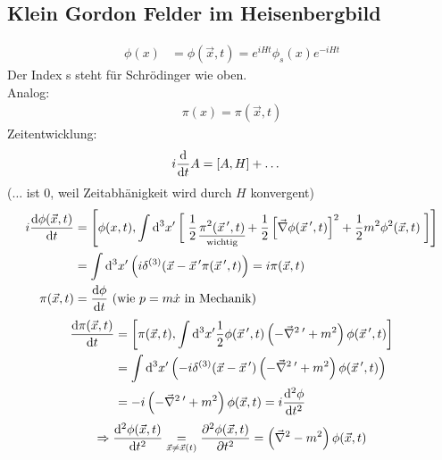 \subsection{Klein Gordon Felder im Heisenbergbild}
	\begin{align*}
		\phi (x) &= \phi(\vec{x}, t) = e^{i H t} \phi_s (x) e^{-i H t}
	\end{align*}
Der Index s steht für Schrödinger wie oben. 
\\
Analog:
	\begin{align*}
		\pi(x) = \pi(\vec{x}, t) 
	\end{align*}
Zeitentwicklung:
	\begin{align*}
		i \frac{\mathrm{d}}{\mathrm{d} t} A &= [A, H] + \ldots  
	\end{align*}
($\ldots$ ist 0, weil Zeitabhänigkeit wird durch $H$ konvergent) 
	\begin{align*}
		i \frac{\diff \phi(\vec{x}, t)}{\diff t} &= 
		\left[
			\phi(x, t), \int \diff^3 x' 
			\left[ \vphantom{\frac{1}{2}} \right.
				\frac{1}{2} \,\underset{\text{wichtig}}{\underline{\pi^2(\vec{x}\,', t)}} + \frac{1}{2}
				\left[
					\vec{\nabla} \phi (\vec{x}\,', t) 
				\right]^2 + \frac{1}{2} m^2 \phi^2(\vec{x}, t)
			\left. \vphantom{\frac{1}{2}} \right]
		\right] \\
		&= \int \diff^3 x' 
		\left(
			i \delta^{(3)} (\vec{x} - \vec{x}\,' \pi (\vec{x}\,', t) 
		\right) 
		= i \pi (\vec{x}, t) \\
		\pi (\vec{x}, t) &= \frac{\diff \phi}{\diff t} ~(\text{wie } p = m \dot{x} \text{ in Mechanik})
	\end{align*}
	\begin{align*}
		\frac{\mathrm{d} \pi (\vec{x}, t)}{\mathrm{d} t} &= 
		\left[
			\pi (\vec{x}, t) , \int \mathrm{d}^3 x' \frac{1}{2} \phi (\vec{x}\,', t)
			\left(
				-\vec{\nabla}^2\,' + m^2
			\right) \phi(\vec{x}\,', t)
		\right] \\
		&= \int \mathrm{d}^3 x' 
		\left(
			-i \delta^{(3)}(\vec{x} - \vec{x}\,') 
			\left(
				-\vec{\nabla}^2\,' + m^2 
			\right) \phi (\vec{x}\,', t)
		\right) \\
		&= -i \left(
			- \vec{\nabla}^2\,' + m^2
		\right) \phi(\vec{x}, t) = i \frac{\mathrm{d}^2 \phi}{\mathrm{d} t^2}
	\end{align*}
	\begin{align*}
		\Rightarrow \frac{\mathrm{d}^2 \phi(\vec{x}, t)}{\mathrm{d} t^2} \underset{\vec{x} \neq \vec{x}(t)}{=} \frac{\partial^2 \phi(\vec{x}, t)}{\partial t^2} 
		= \left(
			\vec{\nabla}^2 -m^2 
		\right) \phi(\vec{x}, t)
	\end{align*}
